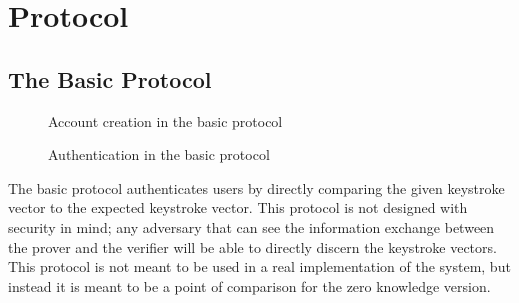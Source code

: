 \documentclass[11pt]{article}
\begin{document}
\section{Protocol}
\subsection{The Basic Protocol}

\begin{figure}[h!]
\centering
{}
\caption{Account creation in the basic protocol}
\label{fig:basic_new}
\end{figure}

\begin{figure}[h!]
\centering
{}
\caption{Authentication in the basic protocol}
\label{fig:basic_auth}
\end{figure}
The basic protocol authenticates users by directly comparing the given keystroke vector to the expected keystroke vector. This protocol is not designed with security in mind; any adversary that can see the information exchange between the prover and the verifier will be able to directly discern the keystroke vectors. This protocol is not meant to be used in a real implementation of the system, but instead it is meant to be a point of comparison for the zero knowledge version.
\end{document}

